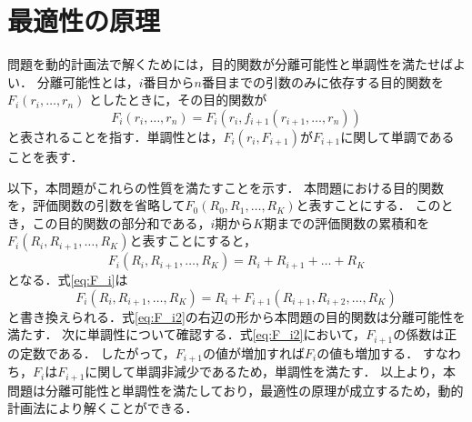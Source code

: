 \section{最適性の原理}
	問題を動的計画法で解くためには，目的関数が分離可能性と単調性を満たせばよい\cite{h}．
	分離可能性とは，$i$番目から$n$番目までの引数のみに依存する目的関数を$F_i(r_i,\dots,r_n)$
	としたときに，その目的関数が
	\begin{equation}
		F_i(r_i,\dots,r_n) = F_i(r_i,f_{i+1}(r_{i+1},\dots,r_n))
		\label{eq:dp_bunri}
	\end{equation}
	と表されることを指す．単調性とは，$F_i(r_i,F_{i+1})$が$F_{i+1}$に関して単調であることを表す．
	
	以下，本問題がこれらの性質を満たすことを示す．
	 本問題における目的関数を，評価関数の引数を省略して$F_{0}(R_0,R_1,\dots,R_{K})$と表すことにする．
	このとき，この目的関数の部分和である，$i$期から$K$期までの評価関数の累積和を$F_{i}(R_i,R_{i+1},\dots,R_{K})$と表すことにすると，
	\begin{equation}
		F_{i}(R_i,R_{i+1},\dots,R_{K}) = R_i+ R_{i+1}+\dots+R_{K}
		\label{eq:F_i}
	\end{equation}
	となる．式\eqref{eq:F_i}は
	\begin{equation}
		F_{i}(R_i,R_{i+1},\dots,R_{K}) = R_{i} + F_{i+1}(R_{i+1},R_{i+2},\dots,R_{K})
		\label{eq:F_i2}
	\end{equation}	
	と書き換えられる．式\eqref{eq:F_i2}の右辺の形から本問題の目的関数は分離可能性を満たす．
	次に単調性について確認する．式\eqref{eq:F_i2}において，$F_{i+1}$の係数は正の定数である．
	したがって，$F_{i+1}$の値が増加すれば$F_i$の値も増加する．
	すなわち，$F_i$は$F_{i+1}$に関して単調非減少であるため，単調性を満たす．
	以上より，本問題は分離可能性と単調性を満たしており，最適性の原理が成立するため，動的計画法により解くことができる．
	
